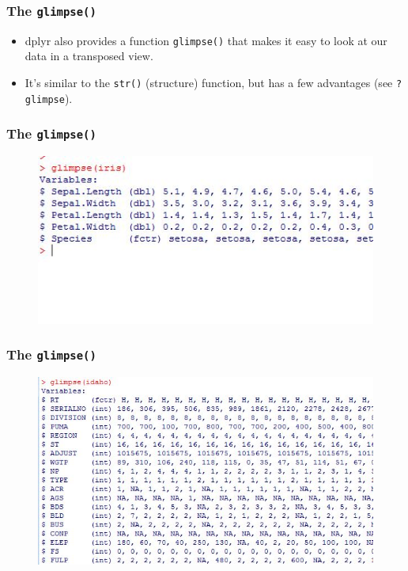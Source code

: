 \documentclass{beamer}
\begin{document}
	\begin{frame}[fragile]
		
		\frametitle{The \texttt{glimpse()}} 
			\begin{itemize}
				\item dplyr also provides a function \texttt{glimpse()} that makes it easy to look at our data in a transposed view. 
				
				\item It's similar to the \texttt{str()} (structure) function, but has a few advantages (see \texttt{?glimpse}).
				
			\end{itemize}
		\end{frame}
		\begin{frame}[fragile]
			
			\frametitle{The \texttt{glimpse()} }
				\begin{figure}
					\centering
					\includegraphics[width=1.2\linewidth]{images/irisglimpse}
				
				\end{figure}
				
			\end{frame}
			\begin{frame}[fragile]
				\frametitle{The \texttt{glimpse()} }
					
\begin{figure}
\centering
\includegraphics[width=1.2\linewidth]{images/idahoglimpse}

\end{figure}
					
				\end{frame}
\end{document}

